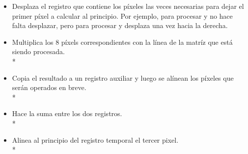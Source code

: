 \begin{itemize}

\item Desplaza el registro que contiene los p\'ixeles las veces necesarias para dejar el primer p\'ixel a calcular al principio. Por ejemplo, para procesar  y  no hace falta desplazar, pero para procesar  y  desplaza una vez hacia la derecha.

\item Multiplica los 8 p\'ixels correspondientes con la l\'inea de la matr\'iz que est\'a siendo procesada.\\*


\item Copia el resultado a un registro auxiliar y luego se al\'inean los p\'ixeles que ser\'an operados en breve.\\*


\item Hace la suma entre los dos registros.\\*


\item Alinea al principio del registro temporal el tercer pixel. \\*



\end{itemize}
